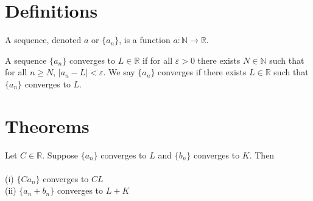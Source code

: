 %



\section{Definitions}

\begin{definition}[Sequence]
  \label{def:sequence}
  A sequence, denoted $a$ or $\{a_n\}$, is a function $a : ℕ → \mathbb{R}$.
\end{definition}

\begin{definition}[Convergence]
  \label{def:convergence}
  \leanok

  A sequence $\{a_n\}$ converges to $L ∈ \mathbb{R}$ if for all $\varepsilon > 0$ there exists
  $N ∈ ℕ$ such that for all $n ≥ N$, $|a_n - L| < \varepsilon$.
  We say $\{a_n\}$ converges if there exists $L ∈ \mathbb{R}$ such that $\{a_n\}$ converges to $L$.

\end{definition}


\section{Theorems}


\begin{theorem}
  \label{thm:limit_laws}

  Let $C \in \mathbb{R}$. Suppose $\{a_n\}$ converges to $L$ and $\{b_n\}$ converges to $K$. Then \\ \\
  (i) $\{C a_n\}$ converges to $C L$ \\
  (ii) $\{a_n + b_n\}$ converges to $L + K$ 

\end{theorem}

